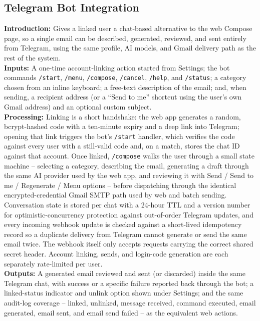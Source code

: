 \documentclass[12pt,a4paper]{article}
\begin{document}
\subsection{Telegram Bot Integration}
\noindent\textbf{Introduction:} Gives a linked user a chat-based alternative to the web Compose page, so a single email can be described, generated, reviewed, and sent entirely from Telegram, using the same profile, AI models, and Gmail delivery path as the rest of the system.\\
\noindent\textbf{Inputs:} A one-time account-linking action started from Settings; the bot commands \texttt{/start}, \texttt{/menu}, \texttt{/compose}, \texttt{/cancel}, \texttt{/help}, and \texttt{/status}; a category chosen from an inline keyboard; a free-text description of the email; and, when sending, a recipient address (or a ``Send to me'' shortcut using the user's own Gmail address) and an optional custom subject.\\
\noindent\textbf{Processing:} Linking is a short handshake: the web app generates a random, bcrypt-hashed code with a ten-minute expiry and a deep link into Telegram; opening that link triggers the bot's \texttt{/start} handler, which verifies the code against every user with a still-valid code and, on a match, stores the chat ID against that account. Once linked, \texttt{/compose} walks the user through a small state machine -- selecting a category, describing the email, generating a draft through the same AI provider used by the web app, and reviewing it with Send / Send to me / Regenerate / Menu options -- before dispatching through the identical encrypted-credential Gmail SMTP path used by web and batch sending. Conversation state is stored per chat with a 24-hour TTL and a version number for optimistic-concurrency protection against out-of-order Telegram updates, and every incoming webhook update is checked against a short-lived idempotency record so a duplicate delivery from Telegram cannot generate or send the same email twice. The webhook itself only accepts requests carrying the correct shared secret header. Account linking, sends, and login-code generation are each separately rate-limited per user.\\
\noindent\textbf{Outputs:} A generated email reviewed and sent (or discarded) inside the same Telegram chat, with success or a specific failure reported back through the bot; a linked-status indicator and unlink option shown under Settings; and the same audit-log coverage -- linked, unlinked, message received, command executed, email generated, email sent, and email send failed -- as the equivalent web actions.
\end{document}
